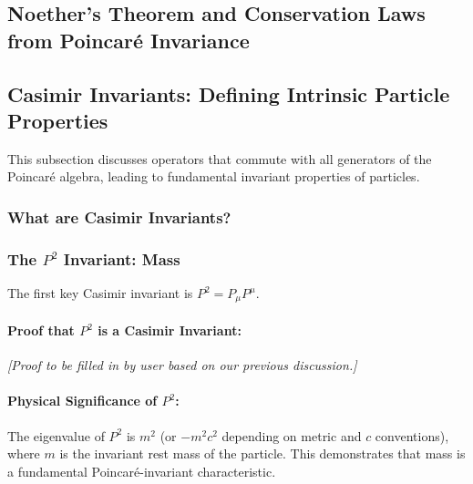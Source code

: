 \documentclass{amsart}
\theoremstyle{definition}
\theoremstyle{remark}
\begin{document}
\subsection{Noether's Theorem and Conservation Laws from Poincaré Invariance}
\label{subsec:noether_poincare}

\subsection{Casimir Invariants: Defining Intrinsic Particle Properties}
\label{subsec:casimir_invariants}
This subsection discusses operators that commute with all generators of the Poincaré algebra, leading to fundamental invariant properties of particles.

\subsubsection{What are Casimir Invariants?}
\label{subsubsec:what_are_casimirs}

\subsubsection{The $P^2$ Invariant: Mass}
\label{subsubsec:p_squared_invariant}
The first key Casimir invariant is $P^2 = P_\mu P^\mu$.

\paragraph{Proof that $P^2$ is a Casimir Invariant:}
\textit{[Proof to be filled in by user based on our previous discussion.]}

\paragraph{Physical Significance of $P^2$:}
The eigenvalue of $P^2$ is $m^2$ (or $-m^2 c^2$ depending on metric and $c$ conventions), where $m$ is the invariant rest mass of the particle.
This demonstrates that mass is a fundamental Poincaré-invariant characteristic.
\end{document}

